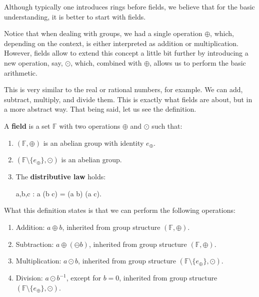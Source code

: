 \documentclass[../lecture-notes-148x210.tex]{subfiles}
\begin{document}
Although typically one introduces rings before fields, we believe that for the 
basic understanding, it is better to start with fields. 

Notice that when dealing with groups, we had a single operation $\oplus$, which, depending on the context, is either 
interpreted as addition or multiplication. However, fields allow to extend this concept a little bit further by 
introducing a new operation, say, $\odot$, which, combined with $\oplus$, allows us to perform the basic arithmetic.

This is very similar to the real or rational numbers, for example. We can add, subtract, multiply, and divide them. 
This is exactly what fields are about, but in a more abstract way. That being said, let us see the definition.

\begin{definition}
    A \textbf{field} is a set $\mathbb{F}$ with two operations $\oplus$ and $\odot$ such that:
    \begin{enumerate}
        \item $(\mathbb{F}, \oplus)$ is an abelian group with identity $e_{\oplus}$.
        \item $(\mathbb{F} \setminus \{e_{\oplus}\}, \odot)$ is an abelian group.
        \item The \textbf{distributive law} holds: 
        \begin{xequation}
            \forall a,b,c \in {}: a \odot (b \oplus c) = (a \odot b) \oplus (a \odot c).            
        \end{xequation}
    \end{enumerate}
\end{definition}

What this definition states is that we can perform the following operations:
\begin{enumerate}
    \item Addition: $a \oplus b$, inherited from group structure $(\mathbb{F}, \oplus)$.
    \item Subtraction: $a \oplus (\ominus b)$, inherited from group structure $(\mathbb{F}, \oplus)$.
    \item Multiplication: $a \odot b$, inherited from group structure $(\mathbb{F} \setminus \{e_{\oplus}\}, \odot)$.
    \item Division: $a \odot b^{-1}$, except for $b=0$, inherited from group structure $(\mathbb{F} \setminus \{e_{\oplus}\}, \odot)$.
\end{enumerate}
\end{document}
